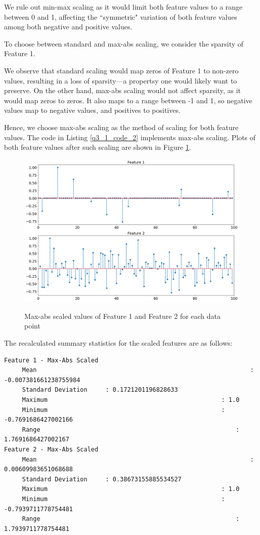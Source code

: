 \documentclass{article}[a4paper]
\begin{document}
	We rule out min-max scaling as it would limit both feature values to a range between 0 and 1, affecting the 
	``symmetric" variation of both feature values among both negative and positive values.
	\newline

	To choose between standard and max-abs scaling, we consider the sparsity of Feature 1.
	\newline
	
	We observe that standard scaling would map zeros of Feature 1 to non-zero values, resulting in a loss of sparsity---a propertsy
	one would likely want to preserve. On the other hand, max-abs scaling would not affect sparsity, as it would map zeros to zeros.
	It also maps to a range between -1 and 1, so negative values map to negative values, and positives to positives.
	\newline

	Hence, we choose max-abs scaling as the method of scaling for both feature values. The code in Listing \ref{q3_1_code_2} implements
	max-abs scaling. Plots of both feature values after such scaling are shown in Figure \ref{q3_1_2_img}.
	
	\begin{figure}[H]
		\centering
		\includegraphics[width=\linewidth]{images/q3_1_2.png}
		\label{q3_1_2_img}
		\caption{Max-abs scaled values of Feature 1 and Feature 2 for each data point}
	\end{figure}
	
	The recalculated summary statistics for the scaled features are as follows:
	\begin{verbatim}
Feature 1 - Max-Abs Scaled
	 Mean 															: -0.007381661238755984
	 Standard Deviation 	: 0.1721201196828633
	 Maximum 												: 1.0
	 Minimum 												: -0.7691686427002166
	 Range 														: 1.7691686427002167
Feature 2 - Max-Abs Scaled
	 Mean 															: 0.00609983651068688
	 Standard Deviation 	: 0.38673155885534527
	 Maximum 												: 1.0
	 Minimum 												: -0.7939711778754481
	 Range 														: 1.7939711778754481
	\end{verbatim}
\end{document}
